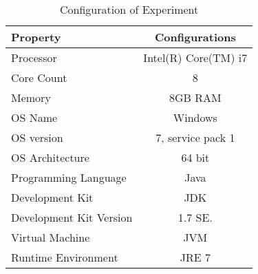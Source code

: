 %
%
\begin{table}
\centering

\begin{tabular}{|l|c|}
\hline 
	Property&Configurations\\ \hline\hline

	Processor		& Intel(R) Core(TM) i7\\ \hline
	Core Count		& 8\\\hline
	Memory			& 8GB RAM \\\hline
	OS Name& Windows\\ \hline
	OS version & 7, service pack 1 \\ \hline
	OS Architecture & 64 bit\\ \hline
	Programming Language & Java\\ \hline
	Development Kit & JDK\\ \hline
	Development Kit Version & 1.7 SE.\\\hline
	Virtual Machine & JVM\\ \hline
	Runtime Environment & JRE 7\\\hline
	\end{tabular}
\caption{Configuration of Experiment}
\label{table:experiment_configuration}
\end{table}
%